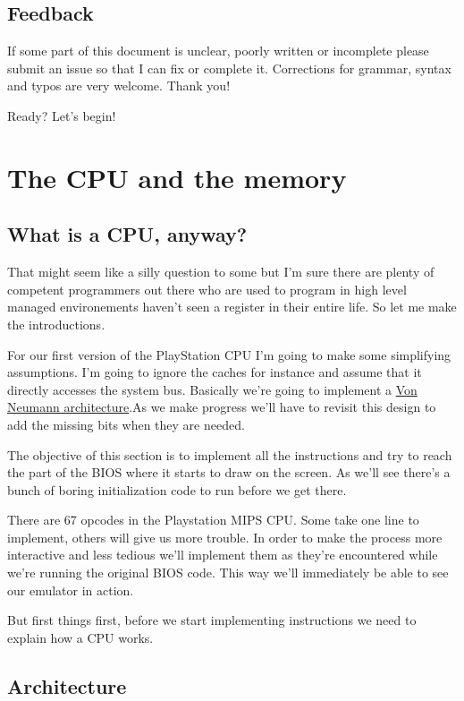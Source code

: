 \documentclass[a4paper]{article}
\begin{document}
\subsection{Feedback}

If some part of this document is unclear, poorly written or incomplete
please submit an issue so that I can fix or complete it. Corrections
for grammar, syntax and typos are very welcome. Thank you!

Ready? Let's begin!

\section{The CPU and the memory}

\subsection{What is a CPU, anyway?}

That might seem like a silly question to some but I'm sure there are
plenty of competent programmers out there who are used to program in
high level managed environements haven't seen a register in their
entire life. So let me make the introductions.

For our first version of the PlayStation CPU I'm going to make some
simplifying assumptions. I'm going to ignore the caches for instance
and assume that it directly accesses the system bus. Basically we're
going to implement a
\href{https://en.wikipedia.org/wiki/Von_Neumann_architecture}{Von
 Neumann architecture}.As we make progress we'll have to revisit this
design to add the missing bits when they are needed.

The objective of this section is to implement all the instructions and
try to reach the part of the BIOS where it starts to draw on the
screen. As we'll see there's a bunch of boring initialization code to
run before we get there.

There are 67 opcodes in the Playstation MIPS CPU. Some take one line
to implement, others will give us more trouble. In order to make the
process more interactive and less tedious we'll implement them as
they're encountered while we're running the original BIOS code. This
way we'll immediately be able to see our emulator in action.

But first things first, before we start implementing instructions we
need to explain how a CPU works.

\subsection{Architecture}
\end{document}

